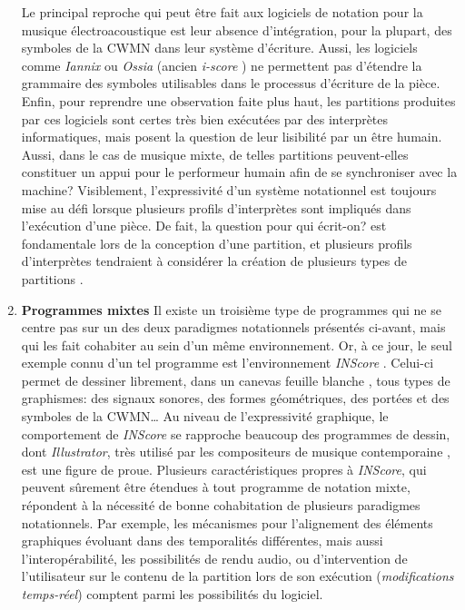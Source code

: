 \begin{enumerate}[label=(\arabic*)]
	Le principal reproche qui peut être fait aux logiciels de notation pour la musique électroacoustique est leur absence d'intégration, pour la plupart, des symboles de la CWMN dans leur système d'écriture. Aussi, les logiciels comme \textit{Iannix} \cite{coduys2003} ou \textit{Ossia} (ancien \textit{i-score} \cite{assayag2008}) ne permettent pas d'étendre la grammaire des symboles utilisables dans le processus d'écriture de la pièce. Enfin, pour reprendre une observation faite plus haut, les partitions produites par ces logiciels sont certes très bien exécutées par des interprètes informatiques, mais posent la question de leur lisibilité par un être humain. Aussi, dans le cas de musique mixte, de telles partitions peuvent-elles constituer un appui pour le performeur humain afin de se synchroniser avec la machine? Visiblement, l'expressivité d'un système notationnel est toujours mise au défi lorsque plusieurs profils d'interprètes sont impliqués dans l'exécution d'une pièce. De fait, la question \og pour qui écrit-on? \fg est fondamentale lors de la conception d'une partition, et plusieurs profils d'interprètes tendraient à considérer la création de plusieurs types de partitions \cite{pope1986}.
	
	\item \textbf{Programmes mixtes} Il existe un troisième type de programmes qui ne se centre pas sur un des deux paradigmes notationnels présentés ci-avant, mais qui les fait cohabiter au sein d'un même environnement.
	Or, à ce jour, le seul exemple connu d'un tel programme est l'environnement \textit{INScore} \cite{fober2012}. Celui-ci permet de dessiner librement, dans un canevas \og feuille blanche \fg, tous types de graphismes: des signaux sonores, des formes géométriques, des portées et des symboles de la CWMN…
	Au niveau de l'expressivité graphique, le comportement de \textit{INScore} se rapproche beaucoup des programmes de dessin, dont \textit{Illustrator}, très utilisé par les compositeurs de musique contemporaine \cite{gottfried2015}, est une figure de proue.
	Plusieurs caractéristiques propres à \textit{INScore}, qui peuvent sûrement être étendues à tout programme de notation mixte, répondent à la nécessité de bonne cohabitation de plusieurs paradigmes notationnels.
	Par exemple, les mécanismes pour l'alignement des éléments graphiques évoluant dans des temporalités différentes, mais aussi l'interopérabilité, les possibilités de rendu audio, ou d'intervention de l'utilisateur sur le contenu de la partition lors de son exécution (\textit{modifications temps-réel}) comptent parmi les possibilités du logiciel.
\end{enumerate}

